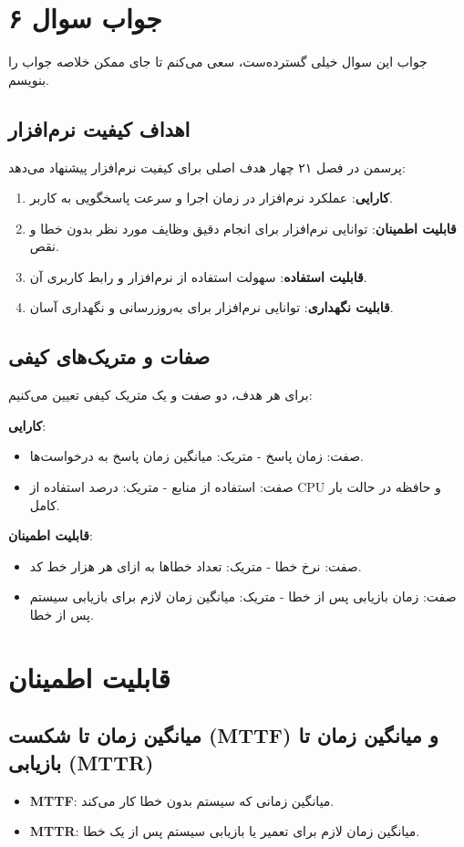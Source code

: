 \section*{جواب سوال ۶}

جواب این سوال خیلی گسترده‌ست، سعی می‌کنم تا جای ممکن خلاصه جواب را بنویسم.

\subsection*{اهداف کیفیت نرم‌افزار}
پرسمن در فصل ۲۱ چهار هدف اصلی برای کیفیت نرم‌افزار پیشنهاد می‌دهد:
\begin{enumerate}
	\item \textbf{کارایی}: عملکرد نرم‌افزار در زمان اجرا و سرعت پاسخگویی به کاربر.
	\item \textbf{قابلیت اطمینان}: توانایی نرم‌افزار برای انجام دقیق وظایف مورد نظر بدون خطا و نقص.
	\item \textbf{قابلیت استفاده}: سهولت استفاده از نرم‌افزار و رابط کاربری آن.
	\item \textbf{قابلیت نگهداری}: توانایی نرم‌افزار برای به‌روزرسانی و نگهداری آسان.
\end{enumerate}

\subsection*{صفات و متریک‌های کیفی}
برای هر هدف، دو صفت و یک متریک کیفی تعیین می‌کنیم:

\textbf{کارایی}:
\begin{itemize}
	\item صفت: زمان پاسخ - متریک: میانگین زمان پاسخ به درخواست‌ها.
	\item صفت: استفاده از منابع - متریک: درصد استفاده از CPU و حافظه در حالت بار کامل.
\end{itemize}

\textbf{قابلیت اطمینان}:
\begin{itemize}
	\item صفت: نرخ خطا - متریک: تعداد خطاها به ازای هر هزار خط کد.
	\item صفت: زمان بازیابی پس از خطا - متریک: میانگین زمان لازم برای بازیابی سیستم پس از خطا.
\end{itemize}

\section*{قابلیت اطمینان}

\subsection*{میانگین زمان تا شکست (MTTF) و میانگین زمان تا بازیابی (MTTR)}
\begin{itemize}
	\item \textbf{MTTF}: میانگین زمانی که سیستم بدون خطا کار می‌کند.
	\item \textbf{MTTR}: میانگین زمان لازم برای تعمیر یا بازیابی سیستم پس از یک خطا.
\end{itemize}

